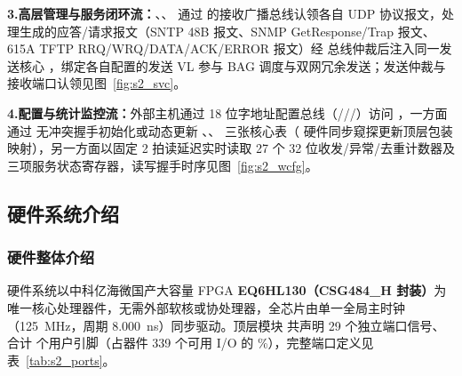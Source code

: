 \noindent \textbf{3.\quad 高层管理与服务闭环流：}、、 通过  的接收广播总线认领各自 UDP 协议报文，处理生成的应答/请求报文（SNTP 48B 报文、SNMP GetResponse/Trap 报文、615A TFTP RRQ/WRQ/DATA/ACK/ERROR 报文）经  总线仲裁后注入同一发送核心 ，绑定各自配置的发送 VL 参与 BAG 调度与双网冗余发送；发送仲裁与接收端口认领见图~\ref{fig:s2_svc}。

\noindent \textbf{4.\quad 配置与统计监控流：}外部主机通过 18 位字地址配置总线（///）访问 ，一方面通过  无冲突握手初始化或动态更新 、、 三张核心表（ 硬件同步窥探更新顶层包装映射），另一方面以固定 2 拍读延迟实时读取 27 个 32 位收发/异常/去重计数器及三项服务状态寄存器，读写握手时序见图~\ref{fig:s2_wcfg}。


\subsection{硬件系统介绍}

\subsubsection{硬件整体介绍}

硬件系统以中科亿海微国产大容量 FPGA \textbf{EQ6HL130（CSG484\_H 封装）}为唯一核心处理器件，无需外部软核或协处理器，全芯片由单一全局主时钟 （125~MHz，周期 8.000~ns）同步驱动。顶层模块  共声明 29 个独立端口信号、合计 \Pins{} 个用户引脚（占器件 339 个可用 I/O 的 \PinPct\%），完整端口定义见表~\ref{tab:s2_ports}。

